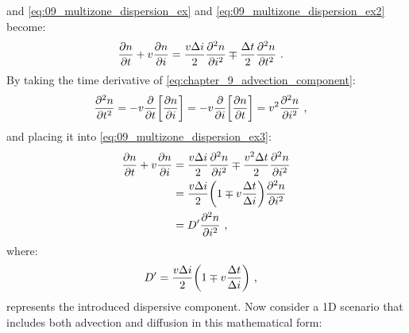 \noindent and \autoref{eq:09_multizone_dispersion_ex} and \autoref{eq:09_multizone_dispersion_ex2} become:
\begin{equation}
    \begin{aligned}
        \pdv{n}{t}+v\pdv{n}{i}&= \frac{v\Delta i}{2}\pdv[2]{n}{i}\mp \frac{\Delta t}{2}\pdv[2]{n}{t} \text{ .} 
    \end{aligned} \label{eq:09_multizone_dispersion_ex3}
\end{equation}
\noindent By taking the time derivative of \autoref{eq:chapter_9_advection_component}:
\begin{equation}
    \begin{aligned}
        \pdv[2]{n}{t}&= -v\pdv{}{t}\qty[\pdv{n}{i}] = -v\pdv{}{i}\qty[\pdv{n}{t}] =v^2\pdv[2]{n}{i}\text{ ,} 
    \end{aligned}
\end{equation}
\noindent and placing it into \autoref{eq:09_multizone_dispersion_ex3}:
\begin{equation}
    \begin{aligned}
        \pdv{n}{t}+v\pdv{n}{i}&= \frac{v\Delta i}{2}\pdv[2]{n}{i}\mp\frac{v^2\Delta t}{2}\pdv[2]{n}{i} \\
        &=\frac{v\Delta i}{2}\qty(1\mp v\frac{\Delta t}{\Delta i})\pdv[2]{n}{i} \\
        &=D' \pdv[2]{n}{i}\text{ ,} 
    \end{aligned}\label{eq:09_multizone_dispersion_ex4}
\end{equation}
\noindent where:
\begin{equation}
    \begin{aligned}
        D'&=\frac{v\Delta i}{2}\qty(1\mp v\frac{\Delta t}{\Delta i})\text{ ,} 
    \end{aligned}
\end{equation}
\noindent represents the introduced dispersive component. Now consider a 1D scenario that includes both advection and diffusion in this mathematical form:

